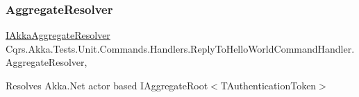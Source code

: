\subsubsection{\texorpdfstring{Aggregate\+Resolver}{AggregateResolver}}
{\footnotesize\ttfamily \hyperlink{interfaceCqrs_1_1Akka_1_1Domain_1_1IAkkaAggregateResolver}{I\+Akka\+Aggregate\+Resolver} Cqrs.\+Akka.\+Tests.\+Unit.\+Commands.\+Handlers.\+Reply\+To\+Hello\+World\+Command\+Handler.\+Aggregate\+Resolver\hspace{0.3cm}{\ttfamily [get]}, {\ttfamily [protected]}}



Resolves Akka.\+Net actor based I\+Aggregate\+Root$<$\+T\+Authentication\+Token$>$ 

